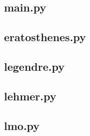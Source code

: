 \subsection{main.py}

\subsection{eratosthenes.py}

\subsection{legendre.py}

\subsection{lehmer.py}
\label{app:lehmer}

\subsection{lmo.py}
\label{app:lmo}
































%


%
